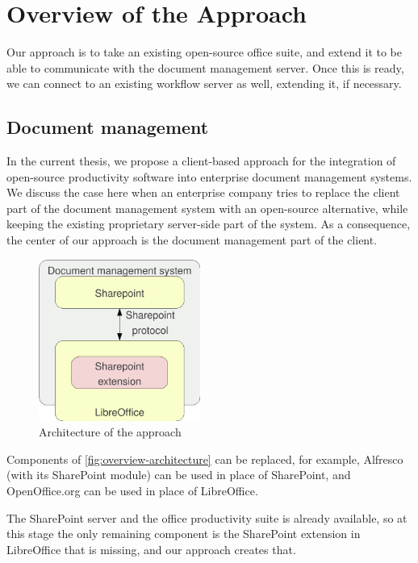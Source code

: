 \chapter{Overview of the Approach}

Our approach is to take an existing open-source office suite, and extend it to
be able to communicate with the document management server. Once this is ready,
we can connect to an existing workflow server as well, extending it, if
necessary.

\section{Document management}

In the current thesis, we propose a client-based approach for the integration
of open-source productivity software into enterprise document management systems.
We discuss the case here when an enterprise company tries to replace the client
part of the document management system with an open-source alternative, while
keeping the existing proprietary server-side part of the system. As a
consequence, the center of our approach is the document management
part of the client.

\begin{figure}[H]
\centering
\includegraphics[width=200px,keepaspectratio]{overview-architecture.pdf}
\caption{Architecture of the approach}
\label{fig:overview-architecture}
\end{figure}

Components of \autoref{fig:overview-architecture} can be replaced, for example, Alfresco (with
its SharePoint module) can be used in place of SharePoint, and OpenOffice.org
can be used in place of LibreOffice.

The SharePoint server and the office productivity suite is already available, so
at this stage the only remaining component is the SharePoint extension in
LibreOffice that is missing, and our approach creates that.

